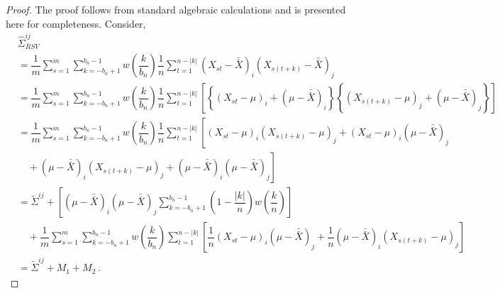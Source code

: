 \documentclass[12pt]{article}
\theoremstyle{remark}
\begin{document}
\begin{proof}
The proof follows from standard algebraic calculations and is presented here for completeness. Consider,
\begin{align*}
&\hat{\Sigma}_{RSV}^{ij} \\
&= \dfrac{1}{m}\sum_{s=1}^{m} \sum_{k=-b_n+1}^{b_n-1}w\left(\dfrac{k}{b_n}\right)\dfrac{1}{n}\sum_{t=1}^{n-|k|} \left(X_{st}-\bar{\bar{X}} \right)_i \left(X_{s(t+k)}-\bar{\bar{X}} \right)_j\\
&= \dfrac{1}{m}\sum_{s=1}^{m}\sum_{k=-b_n+1}^{b_n-1}w\left(\dfrac{k}{b_n}\right)\dfrac{1}{n}\sum_{t=1}^{n-|k|} \left[  \left\{\left(X_{st}-\mu \right)_i + \left(\mu-\bar{\bar{X}} \right)_i \right \}  \left\{ \left(X_{s(t+k)}-\mu \right)_j + \left(\mu-\bar{\bar{X}} \right)_j \right \} \right]\\
&= \dfrac{1}{m}\sum_{s=1}^{m}\sum_{k=-b_n+1}^{b_n-1}w\left(\dfrac{k}{b_n}\right)\dfrac{1}{n}\sum_{t=1}^{n-|k|}  \left[ \left(X_{st}-\mu \right)_i  \left(X_{s(t+k)}-\mu \right)_j+  \left(X_{st} - \mu \right)_i    \left(\mu - \bar{\bar{X}} \right)_j \right. \\  
& \quad + \left. \left(\mu-\bar{\bar{X}} \right)_i  \left(X_{s(t+k)}-\mu \right)_j + \left(\mu-\bar{\bar{X}} \right)_i  \left(\mu-\bar{\bar{X}}  \right)_j  \right]\\
& = \tilde{\Sigma}^{ij} + \left[(\mu-\bar{\bar{X}})_i(\mu-\bar{\bar{X}})_j\sum_{k=-b_n+1}^{b_n-1}\left(1-\dfrac{|k|}{n}\right)w\left(\dfrac{k}{n}\right)\right] \\ 
& \quad  + \dfrac{1}{m}\sum_{s=1}^{m}\sum_{k=-b_n+1}^{b_n-1}  w\left(\dfrac{k}{b_n}\right)\sum_{t=1}^{n-|k|}  \left[\dfrac{1}{n} \left(X_{st} - \mu \right)_i \left(\mu - \bar{\bar{X}} \right)_j + \dfrac{1}{n} \left(\mu-\bar{\bar{X}} \right)_i  \left(X_{s(t+k)}-\mu \right)_j \right] \\ 
& = \tilde{\Sigma}^{ij} + M_1 + M_2\,.
\end{align*}
%
\end{proof}
\end{document}
